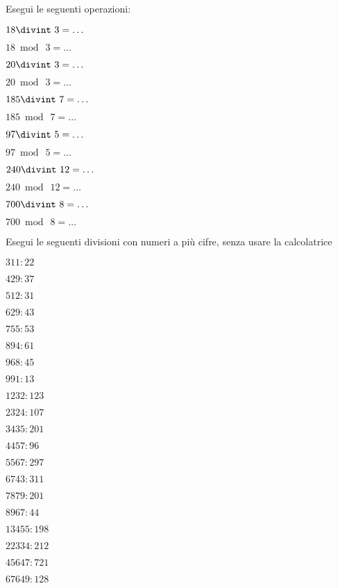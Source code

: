\pagebreak %

\begin{esercizio}
 Esegui le seguenti operazioni:
\begin{htmulticols}{3}
 \begin{enumeratees}
 \item \(18\divint~3=\ldots\)
 \item \(18\bmod~3=\ldots\)
 \item \(20\divint~3=\ldots\)
 \item \(20\bmod~3=\ldots\)
 \item \(185\divint~7=\ldots\)
 \item \(185\bmod~7=\ldots\)
 \item \(97\divint~5=\ldots\)
 \item \(97\bmod~5=\ldots\)
 \item \(240\divint~12=\ldots\)
 \item \(240\bmod~12=\ldots\)
 \item \(700\divint~8=\ldots\)
 \item \(700\bmod~8=\ldots\)
 \end{enumeratees}
\end{htmulticols}
\end{esercizio}


\begin{esercizio}
 Esegui le seguenti divisioni con numeri a più cifre, senza usare la 
calcolatrice
\begin{htmulticols}{4}
 \begin{enumeratees}
 \item \(311:22\)
 \item \(429:37\)
 \item \(512:31\)
 \item \(629:43\)
 \item \(755:53\)
 \item \(894:61\)
 \item \(968:45\)
 \item \(991:13\)
 \item \(1232:123\)
 \item \(2324:107\)
 \item \(3435:201\)
 \item \(4457:96\)
 \item \(5567:297\)
 \item \(6743:311\)
 \item \(7879:201\)
 \item \(8967:44\)
 \item \(13455:198\)
 \item \(22334:212\)
 \item \(45647:721\)
 \item \(67649:128\)
 \end{enumeratees}
\end{htmulticols}
\end{esercizio}

